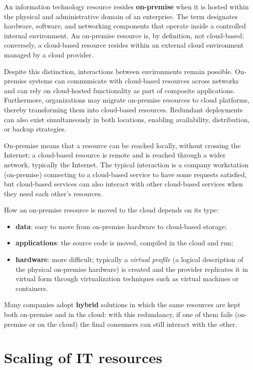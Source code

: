 \documentclass[11pt,a4paper,openany]{report}
\begin{document}
An information technology resource resides \textbf{on-premise} when it is hosted within the physical and administrative domain of an enterprise. The term designates hardware, software, and networking components that operate inside a controlled internal environment. An on-premise resource is, by definition, not cloud-based; conversely, a cloud-based resource resides within an external cloud environment managed by a cloud provider.

Despite this distinction, interactions between environments remain possible. On-premise systems can communicate with cloud-based resources across networks and can rely on cloud-hosted functionality as part of composite applications. Furthermore, organizations may migrate on-premise resources to cloud platforms, thereby transforming them into cloud-based resources. Redundant deployments can also exist simultaneously in both locations, enabling availability, distribution, or backup strategies.

On-premise means that a resource can be reached locally, without crossing the Internet; a cloud-based resource is remote and is reached through a wider network, typically the Internet. The typical interaction is a company workstation (on-premise) connecting to a cloud-based service to have some requests satisfied, but cloud-based services can also interact with other cloud-based services when they need each other's resources.

How an on-premise resource is moved to the cloud depends on its type:

\begin{itemize}
	\item \textbf{data}: easy to move from on-premise hardware to cloud-based storage;
	\item \textbf{applications}: the source code is moved, compiled in the cloud and run;
	\item \textbf{hardware}: more difficult; typically a \emph{virtual profile} (a logical description of the physical on-premise hardware) is created and the provider replicates it in virtual form through virtualization techniques such as virtual machines or containers.
\end{itemize}

Many companies adopt \textbf{hybrid} solutions in which the same resources are kept both on-premise and in the cloud: with this redundancy, if one of them fails (on-premise or on the cloud) the final consumers can still interact with the other.

\section{Scaling of IT resources}
\end{document}

